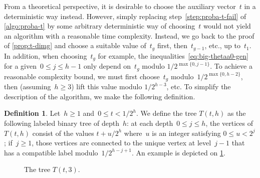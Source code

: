 \documentclass[12pt,oneside]{amsart}
\numberwithin{equation}{section}
\theoremstyle{definition}
\newtheorem{defn}[equation]{Definition}
\begin{document}
From a theoretical perspective, it is desirable to choose the auxiliary
vector~$t$ in a deterministic way instead. However, simply replacing
step~\eqref{step:proba-t-fail} of \cref{algo:proba-t} by some arbitrary
deterministic way of choosing~$t$ would not yield an algorithm with a
reasonable time complexity. Instead, we go back to the proof of
\cref{prop:t-dimg} and choose a suitable value of~$t_g$ first, then~$t_{g-1}$,
etc., up to~$t_1$. In addition, when choosing~$t_g$ for example, the
inequalities~\eqref{eq:big-thetaa0-gen} for a given~$0 \leq j \leq h-1$ only
depend on~$t_g$ modulo $1/2^{\max\{0,j-1\}}$. To achieve a reasonable
complexity bound, we must first choose~$t_g$ modulo~$1/2^{\max\{0,h-2\}}$, then
(assuming~$h\geq 3$) lift this value modulo $1/2^{h-3}$, etc. To simplify the
description of the algorithm, we make the following definition.

\begin{defn}
  \label{def:tree}
  Let~$h\geq 1$ and~$0\leq t < 1/2^h$. We define the tree $T(t,h)$ as the
  following labeled binary tree of depth~$h$: at each depth~$0\leq j\leq h$,
  the vertices of~$T(t,h)$ consist of the values $t + u/2^h$ where~$u$ is an
  integer satisfying $0\leq u< 2^{j}$; if~$j\geq 1$, those vertices are
  connected to the unique vertex at level~$j-1$ that has a compatible label
  modulo~$1/2^{h-j+1}$. An example is depicted on \cref{fig:tree}.
\end{defn}

\begin{figure}[ht]
  \centering
  \caption{The tree $T(t,3)$.}
  \label{fig:tree}
\end{figure}
\end{document}
